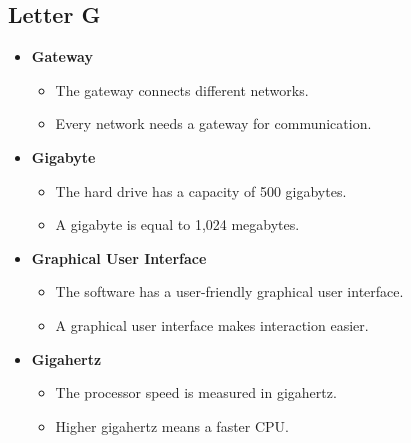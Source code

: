     \subsection{Letter G}
    \begin{itemize}
        \item \textbf{Gateway}
        \begin{itemize}
            \item The gateway connects different networks.
            \item Every network needs a gateway for communication.
        \end{itemize}
        \item \textbf{Gigabyte}
        \begin{itemize}
            \item The hard drive has a capacity of 500 gigabytes.
            \item A gigabyte is equal to 1,024 megabytes.
        \end{itemize}
        \item \textbf{Graphical User Interface}
        \begin{itemize}
            \item The software has a user-friendly graphical user interface.
            \item A graphical user interface makes interaction easier.
        \end{itemize}
        \item \textbf{Gigahertz}
        \begin{itemize}
            \item The processor speed is measured in gigahertz.
            \item Higher gigahertz means a faster CPU.
        \end{itemize}
    \end{itemize}

